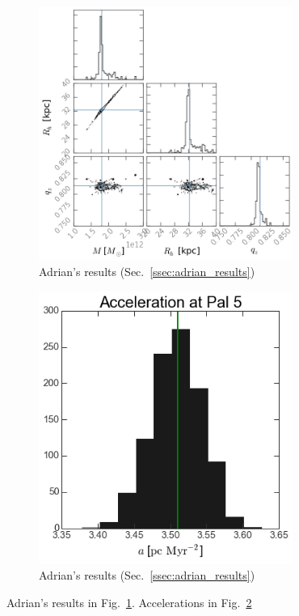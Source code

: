 \begin{figure}
\includegraphics[width=83mm]{figures/adrian_results.png}
  \caption{Adrian's results (Sec.~\ref{ssec:adrian_results})}
  \label{plot_adrian_results}
\end{figure}
\begin{figure}
\includegraphics[width=83mm]{figures/adrian_acc.png}
  \caption{Adrian's results (Sec.~\ref{ssec:adrian_results})}
  \label{plot_adrian_acc}
\end{figure}

Adrian's results in Fig.~\ref{plot_adrian_results}. Accelerations in Fig.~\ref{plot_adrian_acc}

